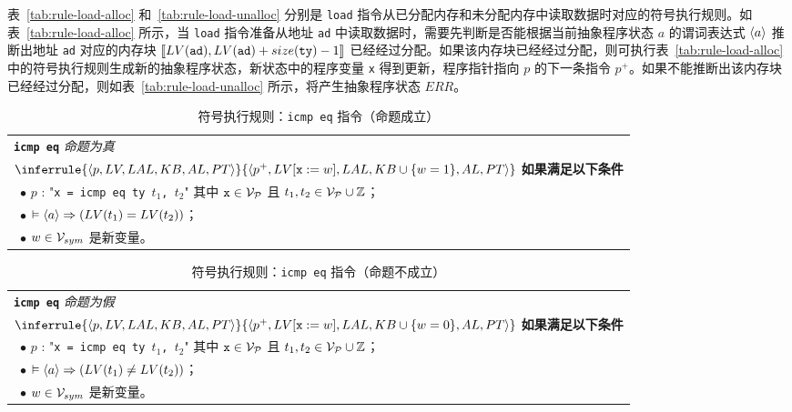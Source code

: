 表~\ref{tab:rule-load-alloc} 和~\ref{tab:rule-load-unalloc} 分别是 \verb|load| 指令从已分配内存和未分配内存中读取数据时对应的符号执行规则。如表~\ref{tab:rule-load-alloc} 所示，当 \verb|load| 指令准备从地址 \verb|ad| 中读取数据时，需要先判断是否能根据当前抽象程序状态 $a$ 的谓词表达式 $\langle a \rangle$ 推断出地址 \verb|ad| 对应的内存块 $\llbracket LV(\texttt{ad}), LV(\texttt{ad})+ size(\texttt{ty}) -1 \rrbracket$ 已经经过分配。如果该内存块已经经过分配，则可执行表~\ref{tab:rule-load-alloc} 中的符号执行规则生成新的抽象程序状态，新状态中的程序变量 \verb|x| 得到更新，程序指针指向 $p$ 的下一条指令 $p^+$。如果不能推断出该内存块已经经过分配，则如表~\ref{tab:rule-load-unalloc} 所示，将产生抽象程序状态 $ERR$。

\begin{table}[htbp]
\caption{符号执行规则：\texttt{icmp eq} 指令（命题成立）}
\label{tab:rule-icmp-eq-true}
\begin{tabularx}{\textwidth}{|X|}
\hline
\textbf{\texttt{icmp eq}} \emph{命题为真} \\
{\centering $
\inferrule
   {\lb p, LV, LAL, KB, AL, PT\rb}
   {\lb p^+, LV[\texttt{x} := w], LAL, KB\cup\{w=1\}, AL, PT\rb}
$ \\}
\textbf{如果满足以下条件} \\
~$\bullet$ $p$ : "\texttt{x = icmp eq ty $t_1$, $t_2$}" 其中 $\texttt{x}\in\mathcal{V}_{\mathcal{P}}$ 且 $t_1,t_2\in\mathcal{V}_{\mathcal{P}}\cup\mathbb{Z}$； \\
~$\bullet$ $\vDash \langle a\rangle \Rightarrow (LV(t_1) = LV(t_2))$；  \\
~$\bullet$ $w\in\mathcal{V}_{sym}$ 是新变量。 \\
\hline
\end{tabularx}
\end{table}

\begin{table}[htbp]
\caption{符号执行规则：\texttt{icmp eq} 指令（命题不成立）}
\label{tab:rule-icmp-eq-false}
\begin{tabularx}{\textwidth}{|X|}
\hline
\textbf{\texttt{icmp eq}} \emph{命题为假} \\
{\centering $
\inferrule
   {\lb p, LV, LAL, KB, AL, PT\rb}
   {\lb p^+, LV[\texttt{x} := w], LAL, KB\cup\{w=0\}, AL, PT\rb}
$ \\}
\textbf{如果满足以下条件} \\
~$\bullet$ $p$ : "\texttt{x = icmp eq ty $t_1$, $t_2$}" 其中 $\texttt{x}\in\mathcal{V}_{\mathcal{P}}$ 且 $t_1,t_2\in\mathcal{V}_{\mathcal{P}}\cup\mathbb{Z}$； \\
~$\bullet$ $\vDash \langle a\rangle \Rightarrow (LV(t_1) \not= LV(t_2))$；  \\
~$\bullet$ $w\in\mathcal{V}_{sym}$ 是新变量。 \\
\hline
\end{tabularx}
\end{table}

